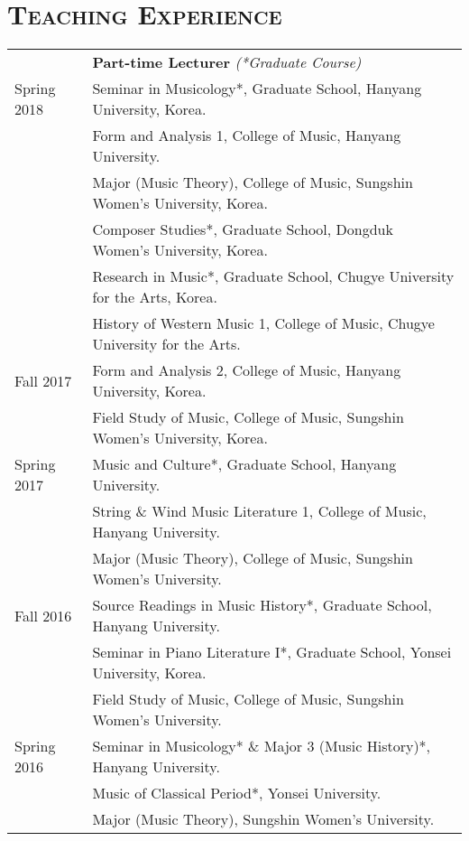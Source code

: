 \documentclass[letter,11pt]{article}
\begin{document}
  \vspace{2.5mm}
  
  \section*{\textsc{Teaching Experience}}
  
  \hspace*{-0.25cm}
  \begin{tabular}{p{2.5cm} l}
    & \textbf{Part-time Lecturer} \textit{(*Graduate Course)}\\
    Spring 2018 & Seminar in Musicology*, Graduate School, Hanyang University, Korea.\\
    & Form and Analysis 1, College of Music, Hanyang University.\\
    & Major (Music Theory), College of Music, Sungshin Women's University, Korea.\\
    & Composer Studies*, Graduate School, Dongduk Women's University, Korea.\\
    & Research in Music*, Graduate School, Chugye University for the Arts, Korea.\\
    & History of Western Music 1, College of Music, Chugye University for the Arts.\\
    
    Fall 2017 & Form and Analysis 2, College of Music, Hanyang University, Korea.\\
    & Field Study of Music, College of Music, Sungshin Women's University, Korea.\\
    
    Spring 2017 & Music and Culture*, Graduate School, Hanyang University.\\
    & String \& Wind Music Literature 1, College of Music, Hanyang University.\\
    & Major (Music Theory), College of Music, Sungshin Women's University.\\
    
    Fall 2016 & Source Readings in Music History*, Graduate School, Hanyang University.\\
    & Seminar in Piano Literature I*, Graduate School, Yonsei University, Korea.\\
    & Field Study of Music, College of Music, Sungshin Women's University.\\
    
    Spring 2016 & Seminar in Musicology* \& Major 3 (Music History)*, Hanyang University.\\
    & Music of Classical Period*, Yonsei University.\\
    & Major (Music Theory), Sungshin Women's University.\\
    

\end{tabular}
\end{document}
